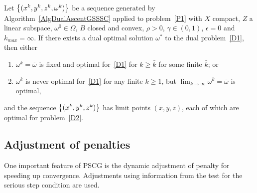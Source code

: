 \begin{proposition}\label{PropFWBCD}
Let $\left\{ (x^k,y^k,z^k,\omega^k) \right \}$ be a sequence generated by Algorithm~\ref{AlgDualAscentGSSSC} applied to problem~\eqref{P1} with $X$ compact, $Z$ a linear subspace, $\omega^0 \in \Omega$, $B$ closed and convex, $\rho > 0$, $\gamma \in (0,1)$, $\epsilon=0$ and $k_{max}=\infty$. 
If there exists a dual optimal solution $\omega^*$ to the dual problem~\eqref{D1}, then either
\begin{enumerate}
\item $\omega^k = \overline{\omega}$ is fixed and optimal for~\eqref{D1} for $k \ge \bar{k}$ for some finite $\bar{k}$; or
\item $\omega^k$ is never optimal for~\eqref{D1} for any finite $k \ge 1$, but $\lim_{k \to \infty} \omega^k = \overline{\omega}$ is optimal,
\end{enumerate}
and the sequence $\left\{ (x^k,y^k,z^k) \right \}$ has limit points $(\overline{x},\overline{y},\overline{z})$, each of which are optimal for problem~\eqref{D2}.
\end{proposition}

\subsection{Adjustment of penalties}

One important feature of PSCG is the dynamic adjustment of penalty for speeding up convergence. Adjustments using information from the test for the serious step condition are used.


